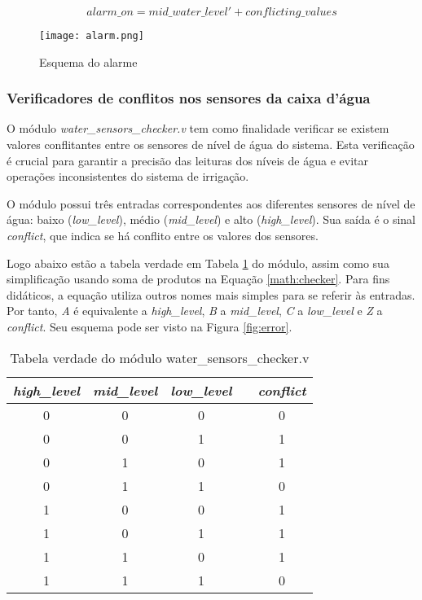 \documentclass[
	article,			%
	11pt,				%
	oneside,			%
	a4paper,			%
	english,			%
	brazil,				%
	sumario=tradicional
	]{abntex2}
\begin{document}
\begin{equation}
alarm\_on = mid\_water\_level' + conflicting\_values
\label{math:alarm}
\end{equation}

\begin{figure}[H]
    \centering
    \texttt{[image: alarm.png]}
    \caption{Esquema do alarme}
    \label{fig:alarm}
\end{figure}

\subsubsection{Verificadores de conflitos nos sensores da caixa d’água}

O módulo \textit{water\_sensors\_checker.v} tem como finalidade verificar se existem valores conflitantes entre os sensores de nível de água do sistema. 
Esta verificação é crucial para garantir a precisão das leituras dos níveis de água e evitar operações inconsistentes do sistema de irrigação.

O módulo possui três entradas correspondentes aos diferentes sensores de nível de água: baixo (\textit{low\_level}), médio (\textit{mid\_level}) e alto (\textit{high\_level}). 
Sua saída é o sinal \textit{conflict}, que indica se há conflito entre os valores dos sensores.

Logo abaixo estão a tabela verdade em Tabela \ref{tab:sensor-checker} do módulo, assim como sua simplificação usando soma de produtos na Equação \eqref{math:checker}. Para fins didáticos, a equação utiliza outros nomes mais simples para se referir às entradas. Por tanto, \textit{A} é equivalente a \textit{high\_level}, \textit{B} a \textit{mid\_level}, \textit{C} a \textit{low\_level} e \textit{Z} a \textit{conflict}. Seu esquema pode ser visto na Figura \ref{fig:error}.


\begin{table}[h]
\centering
\begin{tabular}{|c|c|c|l|c|}
\hline
\textit{high\_level} & \multicolumn{1}{l|}{\textit{mid\_level}} & \textit{low\_level} &  & \textit{conflict} \\ \hline
0 & 0 & 0 &  & 0 \\ \hline
0 & 0 & 1 &  & 1 \\ \hline
0 & 1 & 0 &  & 1 \\ \hline
0 & 1 & 1 &  & 0 \\ \hline
1 & 0 & 0 &  & 1 \\ \hline
1 & 0 & 1 &  & 1 \\ \hline
1 & 1 & 0 &  & 1 \\ \hline
1 & 1 & 1 &  & 0 \\ \hline
\end{tabular}
\caption{Tabela verdade do módulo water\_sensors\_checker.v}
\label{tab:sensor-checker}
\end{table}
\end{document}

